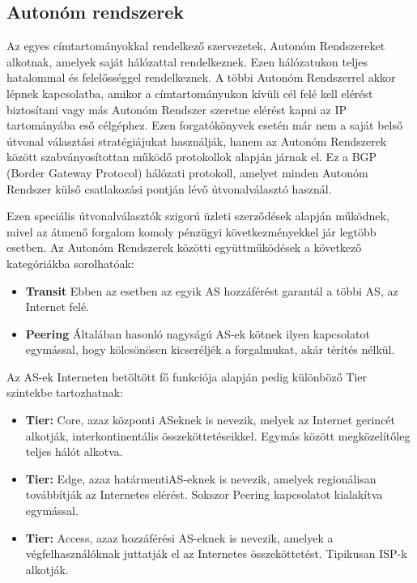 \subsection{Autonóm rendszerek}

Az egyes címtartományokkal rendelkező szervezetek, Autonóm Rendszereket alkotnak, amelyek saját hálózattal rendelkeznek. Ezen hálózatukon teljes hatalommal és felelősséggel rendelkeznek. A többi Autonóm Rendszerrel akkor lépnek kapcsolatba, amikor a címtartományukon kívüli cél felé kell elérést biztosítani vagy más Autonóm Rendszer szeretne elérést kapni az IP tartományába eső célgéphez.
Ezen forgatókönyvek esetén már nem a saját belső útvonal választási stratégiájukat használják, hanem az Autonóm Rendszerek között szabványosítottan működő protokollok alapján járnak el. Ez a BGP (Border Gateway Protocol) hálózati protokoll, amelyet minden Autonóm Rendszer külső csatlakozási pontján lévő útvonalválasztó használ. 

Ezen speciális útvonalválasztók szigorú üzleti szerződések alapján működnek, mivel az átmenő forgalom komoly pénzügyi következményekkel jár legtöbb esetben.
Az Autonóm Rendszerek közötti együttműködések a következő kategóriákba sorolhatóak:

\begin{itemize}
\setlength{\parskip}{0pt}
\setlength{\itemsep}{0pt plus 1pt}
  
\item \textbf{Transit} Ebben az esetben az egyik AS hozzáférést garantál a többi AS, az Internet felé.
\item \textbf{Peering} Általában hasonló nagyságú AS-ek kötnek ilyen kapcsolatot egymással, hogy kölcsönösen kicseréljék a forgalmukat, akár térítés nélkül.
\end{itemize}

Az AS-ek Interneten betöltött fő funkciója alapján pedig különböző Tier szin\-tek\-be tartozhatnak: 

\begin{itemize}
\setlength{\parskip}{0pt}
\setlength{\itemsep}{0pt plus 1pt}
  
\item \textbf{Tier:} Core, azaz központi AS\-eknek is nevezik, melyek az Internet gerincét alkotják, interkontinentális összeköttetéseikkel. Egymás között megközelítőleg teljes hálót alkotva.

\item \textbf{Tier:} Edge, azaz \glqq határmenti\grqq  AS-eknek is nevezik, amelyek regionálisan továbbítják az Internetes elérést. Sokszor Peering kapcsolatot kialakítva egymással.

\item \textbf{Tier:} Access, azaz hozzáférési AS-eknek is nevezik, amelyek a végfelhasználóknak juttatják el az Internetes összeköttetést. Tipikusan ISP-k alkotják.
\end{itemize}

